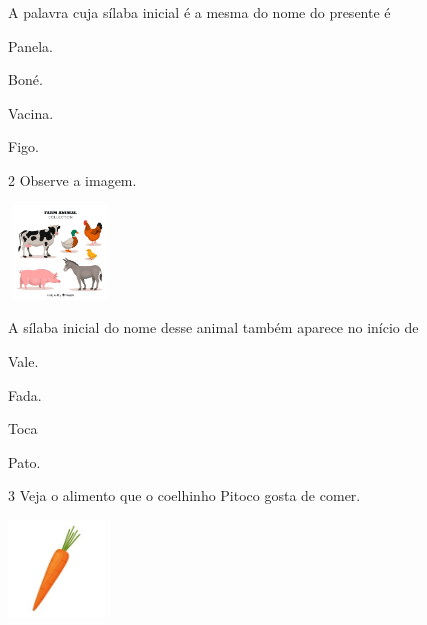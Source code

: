 
A palavra cuja sílaba inicial é a mesma do nome do presente é

\begin{escolha}
\item Panela.

\item Boné.

\item Vacina.

\item Figo.
\end{escolha}

\num{2} Observe a imagem.

\includegraphics[width=1.10000in,height=0.99236in]{media/image148.jpeg}


A sílaba inicial do nome desse animal também aparece no início de

\begin{escolha}
\item Vale.

\item Fada.

\item Toca

\item Pato.
\end{escolha}

\num{3} Veja o alimento que o coelhinho Pitoco gosta de comer.

\includegraphics[width=1.01111in,height=1.01111in]{media/image149.jpeg}


